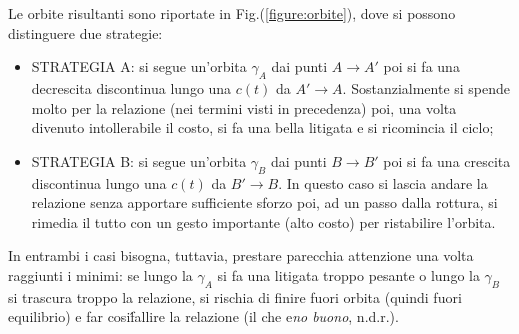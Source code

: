 \documentclass[12pt, a4paper]{book}
\theoremstyle{theorem}
\begin{document}
				Le orbite risultanti sono riportate in Fig.(\ref{figure:orbite}), dove si possono distinguere due strategie:
				\begin{itemize}
					\item STRATEGIA A: si segue un'orbita $\gamma_{A}$ dai punti $A\rightarrow A'$ poi si fa una decrescita discontinua lungo una $c(t)$ da $A'\rightarrow A$.
						Sostanzialmente si spende molto per la relazione (nei termini visti in precedenza) poi, una volta divenuto intollerabile il costo, si fa una bella litigata e si ricomincia il ciclo;
					\item STRATEGIA B: si segue un'orbita $\gamma_{B}$ dai punti $B\rightarrow B'$ poi si fa una crescita discontinua lungo una $c(t)$ da $B'\rightarrow B$.
						In questo caso si lascia andare la relazione senza apportare sufficiente sforzo poi, ad un passo dalla rottura, si rimedia il tutto con un gesto importante (alto costo) per ristabilire l'orbita.
				\end{itemize}
				In entrambi i casi bisogna, tuttavia, prestare parecchia attenzione una volta raggiunti i minimi: se lungo la $\gamma_{A}$ si fa una litigata troppo pesante o lungo la $\gamma_{B}$ si trascura troppo la relazione, si rischia di finire fuori orbita (quindi fuori equilibrio) e far cosi\' fallire la relazione (il che e\' \emph{no buono}, n.d.r.).
\end{document}
